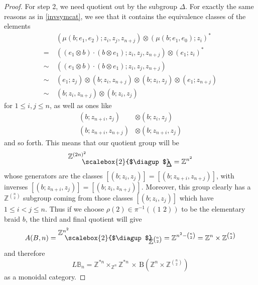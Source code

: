 \documentclass{amsbook} %
\newcommand{\bigquotient}[2]{ \raisebox{0.75\height}{$#1$} \mkern-12mu\scalebox{2}{$\diagup$}\mkern-10mu \raisebox{-0.5\height}{$#2$} }
\newcommand{\trans}[2]{( #1 \, \, #2 )}
\numberwithin{section}{chapter}
\begin{document}
\begin{proof}
For step 2, we need quotient out by the subgroup $\Delta$. For exactly the same reasons as in \cref{invsymcat}, we see that it contains the equivalence classes of the elements
\begin{align*}
			&\left(  \mu(  b  ;  e_1, e_2  )  ;  z_i , z_j, z_{n+j}  \right)  \otimes  \left(   \mu(  b  ;  e_1, e_0  )  ;  z_i  \right)^* \\
			=~&\left(  (  e_1 \otimes b  ) \cdot (  b \otimes e_1 )  ;  z_i , z_j, z_{n+j}  \right)  \otimes  (  e_1  ;  z_i  )^* \\
			\sim~&\left(  (  e_1 \otimes b  ) \cdot (  b \otimes e_1 )  ;  z_i , z_j, z_{n+j}  \right) \\
			\sim~&(e_1 ; z_j) \otimes ( b ;  z_i, z_{n+j}) \otimes ( b ;  z_i , z_{j} ) \otimes (e_1 ;z_{n+j}) \\
			\sim~&(b ;  z_i, z_{n+j}) \otimes (b;  z_i , z_j)
		\end{align*}
for $1 \le i,j \le n$, as well as ones like
  \begin{align*}
    (b ;  z_{n+i}, z_j) &\otimes (b;  z_i , z_j) \\
    (b; z_{n+i}, z_{n+j}) &\otimes (b;  z_{n+i} , z_j)
  \end{align*}
and so forth. This means that our quotient group will be
  \[
    \bigquotient{\mathbb{Z}^{(2n)^2}}{\Delta} = \mathbb{Z}^{n^2}
  \]
whose generators are the classes $[(b; z_i, z_j)] = [(b; z_{n+i}, z_{n+j})]$, with inverses $[(b; z_{n+i}, z_j)] = [(b; z_i, z_{n+j})]$. Moreover, this group clearly has a $\mathbb{Z}^{\binom{n}{2}}$ subgroup coming from those classes $[(b; z_i, z_j)]$ which have $1 \le i < j \le n$. Thus if we choose $\rho(2) \in \pi^{-1}(\trans{1}{2})$ to be the elementary braid $b$, the third and final quotient will give
  \[
    A(B,n) = \bigquotient{\mathbb{Z}^{n^2}}{\mathbb{Z}^{\binom{n}{2}}} = \mathbb{Z}^{n^2 - {\binom{n}{2}}} = \mathbb{Z}^{n} \times \mathbb{Z}^{\binom{n}{2}}
  \]
and therefore
  \[
    L\mathbb{B}_n = \mathbb{Z}^{\ast n} \times_{\mathbb{Z}^n} \mathbb{Z}^{\ast n} \, \times \, \mathrm{B}\left(\mathbb{Z}^{n} \times \mathbb{Z}^{\binom{n}{2}}\right)
  \]
as a monoidal category.
\end{proof} 
\end{document}
